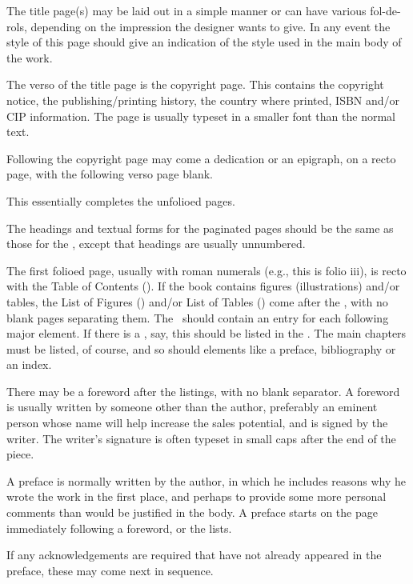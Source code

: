 \documentclass[10pt,letterpaper,extrafontsizes]{memoir}
\begin{document}
    The title page(s) may be laid out in a simple manner or can have various
fol-de-rols, depending on the impression the designer wants to give. In
any event the style of this page should give an indication of the style
used in the main body of the work.

    The verso of the title page is the copyright page.
This contains the copyright notice, the publishing/printing history, 
the country where printed, ISBN and/or CIP information. The page is usually 
typeset in a smaller font than the normal text.

    Following the copyright page may come a dedication or an epigraph, 
on a recto page, with the following verso page blank.

    This essentially completes the unfolioed pages.

    The headings and textual forms for the paginated 
pages should be the same as those for the \pixmainmatter, except that 
headings are usually unnumbered.

    The first folioed page,
usually with roman numerals (e.g., this is folio iii),
is recto with the Table of Contents (\toc). If the book contains 
figures (illustrations) 
and/or tables, the List of Figures (\lof) and/or List of Tables 
(\lot) come after the \toc, with no blank pages separating them. The \toc\ 
should contain an entry for each following major element. If there is a \lot, 
say, this should be listed in the \toc. The main chapters\index{chapter} must 
be listed, of course, and so should elements like a preface\index{preface}, 
bibliography\index{bibliography} or an index\index{index}.

    There may be a foreword after the listings, with no blank
separator. A foreword is usually written by someone other than the author, 
preferably an eminent person whose name will help increase the sales potential,
and is signed by the writer. The writer's
signature is often typeset in small caps after the end of the piece.

   A preface is normally written by the author, in which he
includes reasons why he wrote the work in the first place, and perhaps to 
provide some more personal comments than would be justified in the body. 
A preface starts on the page immediately following a foreword, or the lists.

   If any acknowledgements are required that have not already appeared in the
preface, these may come next in sequence.
\end{document}
